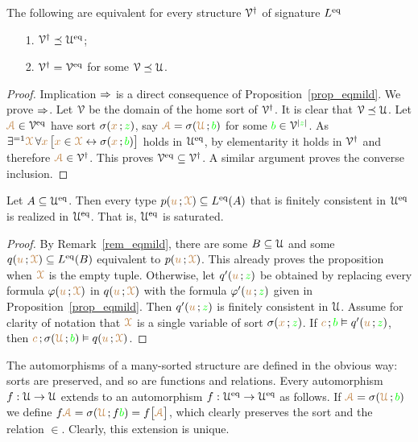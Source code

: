 \documentclass[creche.tex]{subfiles}
\begin{document}
\begin{proposition}
The following are equivalent for every structure $\EuScript V^\dag$ of signature $L^{{\rm eq}}$
\begin{itemize}
\item[1.] $\EuScript V^\dag\preceq\EuScript U^{{\rm eq}}$;
\item[2.] $\EuScript V^\dag=\EuScript V^{{\rm eq}}$ for some $\EuScript V\preceq\EuScript U$.
\end{itemize}
\end{proposition}
\begin{proof}
Implication $\Rightarrow$ is a direct consequence of Proposition~\ref{prop_eqmild}.
We prove $\Rightarrow$.
Let $\EuScript V$ be the domain of the home sort of $\EuScript V^\dag$.
It is clear that $\EuScript V\preceq\EuScript U$.
Let ${\color{brown}\EuScript A}\in\EuScript V^{{\rm eq}}$  have sort $\sigma({\color{brown} x}\,;{\color{green} z})$, say ${\color{brown}\EuScript A}=\sigma({\color{brown}\EuScript U}\,;{\color{green} b})$ for some ${\color{green} b}\in\EuScript V^{|{\color{green} z}|}$.
As $\exists^{=1}{\color{brown}\EuScript X}\, \forall{\color{brown}x}\,\big[{\color{brown} x}\in{\color{brown}\EuScript X}\leftrightarrow\sigma({\color{brown} x}\,;{\color{green} b})\big]$ holds in $\EuScript U^{{\rm eq}}$, by elementarity it holds in $\EuScript V^\dag$ and therefore ${\color{brown}\EuScript A}\in\EuScript V^\dag$.
This proves $\EuScript V^{{\rm eq}}\subseteq\EuScript V^\dag$.
A similar argument proves the converse inclusion.
\end{proof}

\begin{proposition}\label{prop_Ueq_saturated}
Let $A\subseteq\EuScript U^{{\rm eq}}$.
Then every type $p({\color{brown} u}\,;{\color{brown}\EuScript X})\subseteq L^{{\rm eq}}(A)$ that is finitely consistent in $\EuScript U^{{\rm eq}}$ is realized in $\EuScript U^{{\rm eq}}$.
That is, $\EuScript U^{{\rm eq}}$ is saturated.
\end{proposition}
\begin{proof}
By Remark~\ref{rem_eqmild}, there are some $B\subseteq\EuScript U$ and some $q({\color{brown} u}\,;{\color{brown}\EuScript X})\subseteq L^{{\rm eq}}(B)$ equivalent to $p({\color{brown} u}\,;{\color{brown}\EuScript X})$.
This already proves the proposition when ${\color{brown}\EuScript X}$ is the empty tuple.
Otherwise, let $q'({\color{brown} u}\,;{\color{green} z})$ be obtained by replacing every formula $\varphi({\color{brown} u}\,;{\color{brown}\EuScript X})$ in $q({\color{brown} u}\,;{\color{brown}\EuScript X})$ with the formula $\varphi'({\color{brown} u}\,;{\color{green} z})$ given in Proposition~\ref{prop_eqmild}.
Then $q'({\color{brown} u}\,;{\color{green} z})$ is finitely consistent in $\EuScript U$.
Assume for clarity of notation that ${\color{brown}\EuScript X}$ is a single variable of sort $\sigma({\color{brown} x}\,;{\color{green} z})$.
If ${\color{brown} c}\,;{\color{green} b}\vDash q'({\color{brown} u}\,;{\color{green} z})$, then  ${\color{brown} c}\,;\sigma({\color{brown}\EuScript U}\,;{\color{green} b})\vDash q({\color{brown} u}\,;{\color{brown}\EuScript X})$.
\end{proof}


The automorphisms of a many-sorted structure are defined in the obvious way: sorts are preserved, and so are functions and relations.
Every automorphism $f:\EuScript U\rightarrow\EuScript U$ extends to an automorphism $f:\EuScript U^{{\rm eq}}\rightarrow\EuScript U^{{\rm eq}}$ as follows.
If ${\color{brown}\EuScript A}=\sigma({\color{brown}\EuScript U}\,;{\color{green} b})$ we define $f{\color{brown}\EuScript A}=\sigma({\color{brown}\EuScript U}\,;f{\color{green} b})=f\big[{\color{brown}\EuScript A}\big]$, which clearly preserves the sort and the relation $\in$.
Clearly, this extension is unique.
\end{document}
